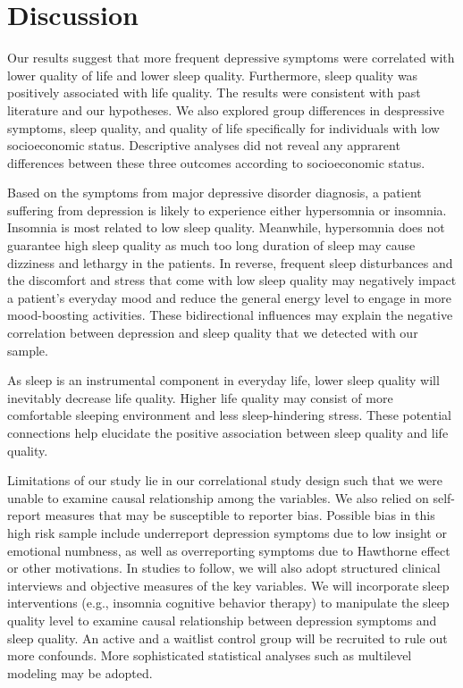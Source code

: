 \documentclass[man, noextraspace]{apa6}
\theoremstyle{definition}
\theoremstyle{definition}
\theoremstyle{definition}
\theoremstyle{remark}
\begin{document}
\section{Discussion}\label{discussion}

Our results suggest that more frequent depressive symptoms were
correlated with lower quality of life and lower sleep quality.
Furthermore, sleep quality was positively associated with life quality.
The results were consistent with past literature and our hypotheses. We
also explored group differences in despressive symptoms, sleep quality,
and quality of life specifically for individuals with low socioeconomic
status. Descriptive analyses did not reveal any apprarent differences
between these three outcomes according to socioeconomic status.

Based on the symptoms from major depressive disorder diagnosis, a
patient suffering from depression is likely to experience either
hypersomnia or insomnia. Insomnia is most related to low sleep quality.
Meanwhile, hypersomnia does not guarantee high sleep quality as much too
long duration of sleep may cause dizziness and lethargy in the patients.
In reverse, frequent sleep disturbances and the discomfort and stress
that come with low sleep quality may negatively impact a patient's
everyday mood and reduce the general energy level to engage in more
mood-boosting activities. These bidirectional influences may explain the
negative correlation between depression and sleep quality that we
detected with our sample.

As sleep is an instrumental component in everyday life, lower sleep
quality will inevitably decrease life quality. Higher life quality may
consist of more comfortable sleeping environment and less
sleep-hindering stress. These potential connections help elucidate the
positive association between sleep quality and life quality.

Limitations of our study lie in our correlational study design such that
we were unable to examine causal relationship among the variables. We
also relied on self-report measures that may be susceptible to reporter
bias. Possible bias in this high risk sample include underreport
depression symptoms due to low insight or emotional numbness, as well as
overreporting symptoms due to Hawthorne effect or other motivations. In
studies to follow, we will also adopt structured clinical interviews and
objective measures of the key variables. We will incorporate sleep
interventions (e.g., insomnia cognitive behavior therapy) to manipulate
the sleep quality level to examine causal relationship between
depression symptoms and sleep quality. An active and a waitlist control
group will be recruited to rule out more confounds. More sophisticated
statistical analyses such as multilevel modeling may be adopted.
\end{document}
